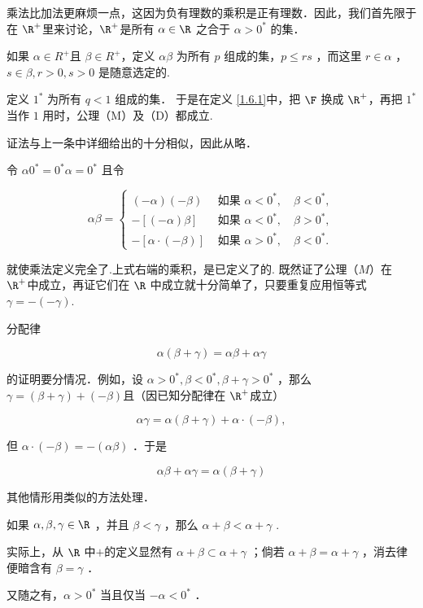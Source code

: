 \begin{definition}
	乘法比加法更麻烦一点，这因为负有理数的乘积是正有理数．因此，我们首先限于在 $\R^{+}$里来讨论，$\R^{+}$是所有 $\alpha \in\R$ 之合于 $\alpha>0^*$ 的集．
	
	如果 $\alpha \in R^{+}$且 $\beta \in R^{+}$，定义 $\alpha \beta$ 为所有 $p$ 组成的集，$p \leqslant r s$ ，而这里 $r \in \alpha$ ， $s \in \beta, r>0, s>0$ 是随意选定的.
	
	定义 $1^*$ 为所有 $q<1$ 组成的集．
	于是在定义 \ref{1.6.1}中，把 $\F$ 换成 $\R^{+}$，再把 $1^*$ 当作 $1$ 用时，公理（M）及（D）都成立.
	
	证法与上一条中详细给出的十分相似，因此从略．
	
	令 $\alpha 0^*=0^* \alpha=0^*$ 且令
	
	$$
	\alpha \beta= \begin{cases}(-\alpha)(-\beta) & \text { 如果 } \alpha<0^*, \quad \beta<0^*, \\ -[(-\alpha) \beta] & \text { 如果 } \alpha<0^*, \quad \beta>0^*, \\ -[\alpha \cdot(-\beta)] & \text { 如果 } \alpha>0^*, \quad \beta<0^* .\end{cases}
	$$
	
	
	就使乘法定义完全了.上式右端的乘积，是已定义了的.
	既然证了公理$（M）$在 $\R^{+}$中成立，再证它们在 $\R$ 中成立就十分简单了，只要重复应用恒等式 $\gamma=-(-\gamma)$.
	
	分配律
	
	$$
	\alpha(\beta+\gamma)=\alpha \beta+\alpha \gamma
	$$
	
	
	的证明要分情况．例如，设 $\alpha>0^*, \beta<0^*, \beta+\gamma>0^*$ ，那么 $\gamma=(\beta+\gamma)+(-\beta)$且（因已知分配律在 $\R^{+}$成立）
	
	$$
	\alpha \gamma=\alpha(\beta+\gamma)+\alpha \cdot(-\beta),
	$$
	
	
	但 $\alpha \cdot(-\beta)=-(\alpha \beta)$ ．于是
	
	$$
	\alpha \beta+\alpha \gamma=\alpha(\beta+\gamma)
	$$
	
	
	其他情形用类似的方法处理．
\end{definition}

如果 $\alpha, \beta, \gamma \in \R$ ，并且 $\beta<\gamma$ ，那么 $\alpha+\beta<\alpha+\gamma$ .

实际上，从 $\R$ 中$+$的定义显然有 $\alpha+\beta \subset \alpha+\gamma$ ；倘若 $\alpha+\beta=\alpha+\gamma$ ，消去律便暗含有 $\beta=\gamma$ ．

又随之有，$\alpha>0^*$ 当且仅当 $-\alpha<0^*$ ．

